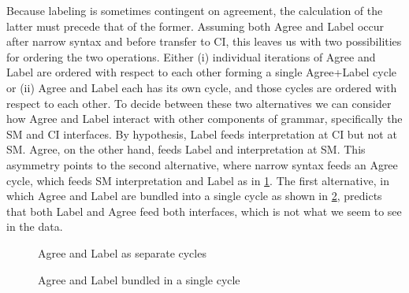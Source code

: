 \documentclass[MilwayThesis]{subfiles}
\begin{document}
Because labeling is sometimes contingent on agreement, the calculation of the latter must precede that of the former.
Assuming both Agree and Label occur after narrow syntax and before transfer to CI, this leaves us with two possibilities for ordering the two operations.
Either (i) individual iterations of Agree and Label are ordered with respect to each other forming a single Agree+Label cycle or (ii) Agree and Label each has its own cycle, and those cycles are ordered with respect to each other.
To decide between these two alternatives we can consider how Agree and Label interact with other components of grammar, specifically the SM and CI interfaces.
By hypothesis, Label feeds interpretation at CI but not at SM.
Agree, on the other hand, feeds Label and interpretation at SM.
This asymmetry points to the second alternative, where narrow syntax feeds an Agree cycle, which feeds SM interpretation and Label as in \ref{fig:SepCycles}.
The first alternative, in which Agree and Label are bundled into a single cycle as shown in \ref{fig:OneCycle}, predicts that both Label and Agree feed both interfaces, which is not what we seem to see in the data. 
\begin{figure}[h]
  \centering
  \caption{Agree and Label as separate cycles}
  \label{fig:SepCycles}
\end{figure}
\begin{figure}[h]
  \centering
  \caption{Agree and Label bundled in a single cycle}
  \label{fig:OneCycle}
\end{figure}
\end{document}
